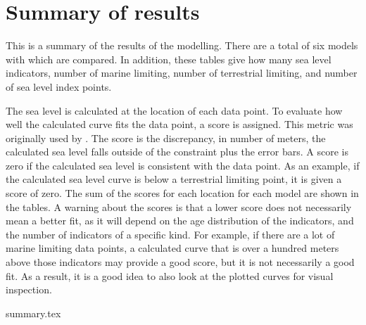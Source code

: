 \section{Summary of results}

This is a summary of the results of the modelling. There are a total of six models with which are compared. In addition, these tables give how many sea level indicators, number of marine limiting, number of terrestrial limiting, and number of sea level index points.

The sea level is calculated at the location of each data point. To evaluate how well the calculated curve fits the data point, a score is assigned. This metric was originally used by \citet{GowanEtal2016}. The score is the discrepancy, in number of meters, the calculated sea level falls outside of the constraint plus the error bars. A score is zero if the calculated sea level is consistent with the data point. As an example, if the calculated sea level curve is below a terrestrial limiting point, it is given a score of zero. The sum of the scores for each location for each model are shown in the tables. A warning about the scores is that a lower score does not necessarily mean a better fit, as it will depend on the age distribution of the indicators, and the number of indicators of a specific kind. For example, if there are a lot of marine limiting data points, a calculated curve that is over a hundred meters above those indicators may provide a good score, but it is not necessarily a good fit. As a result, it is a good idea to also look at the plotted curves for visual inspection. 

{summary.tex}
